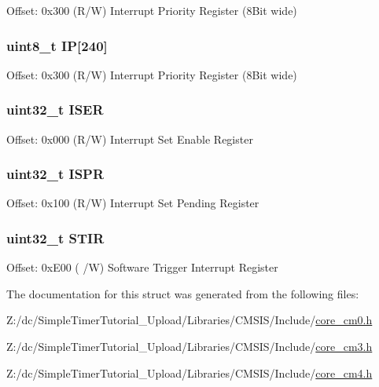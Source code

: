 Offset\-: 0x300 (R/\-W) Interrupt Priority Register (8\-Bit wide) \hypertarget{struct_n_v_i_c___type_a38c377984f751265667317981f101bb4}{
\subsubsection[{I\-P}]{ uint8\-\_\-t I\-P\mbox{[}240\mbox{]}}}\label{struct_n_v_i_c___type_a38c377984f751265667317981f101bb4}
Offset\-: 0x300 (R/\-W) Interrupt Priority Register (8\-Bit wide) \hypertarget{struct_n_v_i_c___type_a95686b1da7037feece357d91ba5f5325}{
\subsubsection[{I\-S\-E\-R}]{ uint32\-\_\-t I\-S\-E\-R}}\label{struct_n_v_i_c___type_a95686b1da7037feece357d91ba5f5325}
Offset\-: 0x000 (R/\-W) Interrupt Set Enable Register \hypertarget{struct_n_v_i_c___type_ae3434eff1b1db4ce857c73a4ef1af273}{
\subsubsection[{I\-S\-P\-R}]{ uint32\-\_\-t I\-S\-P\-R}}\label{struct_n_v_i_c___type_ae3434eff1b1db4ce857c73a4ef1af273}
Offset\-: 0x100 (R/\-W) Interrupt Set Pending Register \hypertarget{struct_n_v_i_c___type_a471c399bb79454dcdfb342a31a5684ae}{
\subsubsection[{S\-T\-I\-R}]{ uint32\-\_\-t S\-T\-I\-R}}\label{struct_n_v_i_c___type_a471c399bb79454dcdfb342a31a5684ae}
Offset\-: 0x\-E00 ( /\-W) Software Trigger Interrupt Register 

The documentation for this struct was generated from the following files\-:\begin{DoxyCompactItemize}
\item 
Z\-:/dc/\-Simple\-Timer\-Tutorial\-\_\-\-Upload/\-Libraries/\-C\-M\-S\-I\-S/\-Include/\hyperlink{core__cm0_8h}{core\-\_\-cm0.\-h}\item 
Z\-:/dc/\-Simple\-Timer\-Tutorial\-\_\-\-Upload/\-Libraries/\-C\-M\-S\-I\-S/\-Include/\hyperlink{core__cm3_8h}{core\-\_\-cm3.\-h}\item 
Z\-:/dc/\-Simple\-Timer\-Tutorial\-\_\-\-Upload/\-Libraries/\-C\-M\-S\-I\-S/\-Include/\hyperlink{core__cm4_8h}{core\-\_\-cm4.\-h}\end{DoxyCompactItemize}
